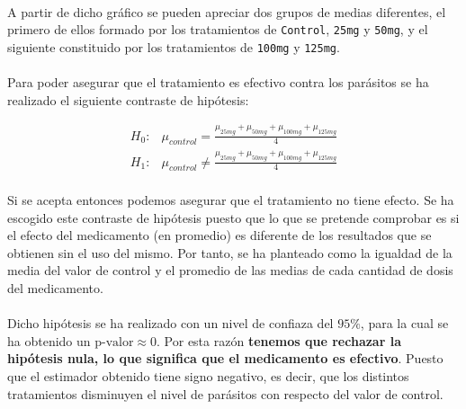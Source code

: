 \documentclass{article}
\begin{document}
      \paragraph{}

      \paragraph{}
      A partir de dicho gráfico se pueden apreciar dos grupos de medias diferentes, el primero de ellos formado por los tratamientos de \texttt{Control}, \texttt{25mg} y \texttt{50mg}, y el siguiente constituido por los tratamientos de \texttt{100mg} y \texttt{125mg}.

      \paragraph{}
      Para poder asegurar que el tratamiento es efectivo contra los parásitos se ha realizado el siguiente contraste de hipótesis:

      \begin{align}
        H_0:& \mu_{control} = \frac{\mu_{25mg} + \mu_{50mg} +\mu_{100mg} +\mu_{125mg}}{4} \\
        H_1:& \mu_{control} \neq \frac{\mu_{25mg} + \mu_{50mg} +\mu_{100mg} +\mu_{125mg}}{4}
      \end{align}

      \paragraph{}
      Si se acepta entonces podemos asegurar que el tratamiento no tiene efecto. Se ha escogido este contraste de hipótesis puesto que lo que se pretende comprobar es si el efecto del medicamento (en promedio) es diferente de los resultados que se obtienen sin el uso del mismo. Por tanto, se ha planteado como la igualdad de la media del valor de control y el promedio de las medias de cada cantidad de dosis del medicamento.

      \paragraph{}
      Dicho hipótesis se ha realizado con un nivel de confiaza del $95\%$, para la cual se ha obtenido un $\text{p-valor}\approx 0$. Por esta razón \textbf{tenemos que rechazar la hipótesis nula, lo que significa que el medicamento es efectivo}. Puesto que el estimador obtenido tiene signo negativo, es decir, que los distintos tratamientos disminuyen el nivel de parásitos con respecto del valor de control.
\end{document}
